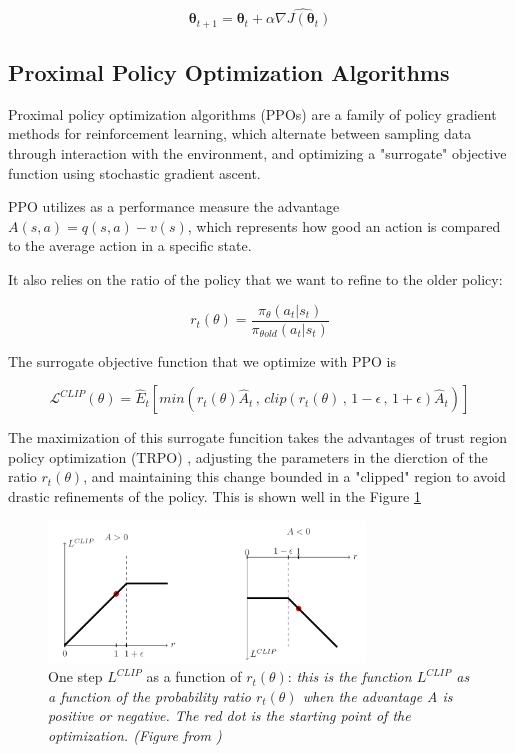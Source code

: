 \begin{equation}
  \mathbf{\theta}_{t+1} =  \mathbf{\theta}_t + \alpha\widehat{\nabla J ( \mathbf{\theta}_t)}
\end{equation}



\subsection{Proximal Policy Optimization Algorithms}

Proximal policy optimization algorithms (PPOs) are a family of policy gradient methods for reinforcement learning, which alternate between sampling data through interaction with the environment, and optimizing a "surrogate" objective function using stochastic gradient ascent. 

PPO utilizes as a performance measure the advantage \( A(s,a) = q(s,a) - v(s) \), which represents how good an action is compared to the average action in a specific state.

It also relies on the ratio of the policy that we want to refine to the older policy:

\begin{equation}
r_t(\theta)= \frac{\pi_\theta(a_t|s_t)}{\pi_{\theta old}(a_t|s_t)}
\end{equation}

The surrogate objective function that we optimize with PPO is 

\begin{equation}
\mathcal{L}^{CLIP} (\theta) = \hat E_t \left[ min(r_t(\theta)\hat A_t \,, \, clip(r_t(\theta) \,,\, 1-\epsilon\,,\, 1+ \epsilon)\hat A_t)\right]
\end{equation}

The maximization of this surrogate funcition takes the advantages of trust region policy optimization (TRPO) \cite{schulman2015high}, adjusting the parameters in the dierction of the ratio \( r_t(\theta) \), and maintaining this change bounded in a "clipped" region to avoid drastic refinements of the policy. This is shown well in the Figure \ref{img:l_clip}


\begin{figure}[h!]
  \centering
  \linespread{.9} 
  \includegraphics[width=0.75\textwidth]{Resources/imgs/L_clip.PNG}
  \caption[One step \( L^{CLIP} \) as a function of \( r_t(\theta) \):  ]%
  {\label{img:l_clip}One step \( L^{CLIP} \) as a function of \( r_t(\theta) \): \small \textit{this is the function \( L^{CLIP} \) as a function of the probability ratio \( r_t(\theta) \) when the advantage A is positive or negative. The red dot is the starting point of the optimization. (Figure from \cite{schulman2017proximal})}}
\end{figure}



